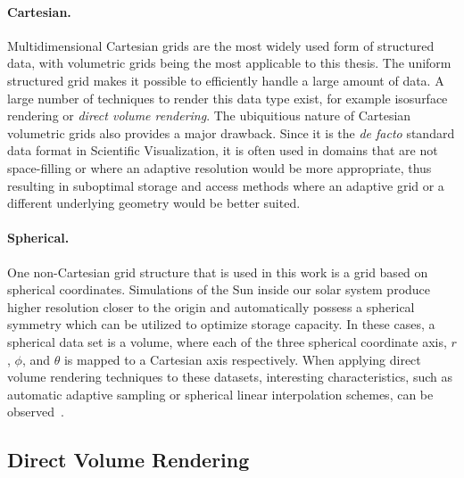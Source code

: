 \paragraph{Cartesian. }  Multidimensional Cartesian grids are the most widely used form of structured data, with  volumetric grids being the most applicable to this thesis.  The uniform structured grid makes it possible to efficiently handle a large amount of data.  A large number of techniques to render this data type exist, for example isosurface rendering or \emph{direct volume rendering}.  The ubiquitious nature of Cartesian volumetric grids also provides a major drawback.  Since it is the \emph{de facto} standard data format in Scientific Visualization, it is often used in domains that are not space-filling or where an adaptive resolution would be more appropriate, thus resulting in suboptimal storage and access methods where an adaptive grid or a different underlying geometry would be better suited.

\paragraph{Spherical. }  One non-Cartesian grid structure that is used in this work is a grid based on spherical coordinates.  Simulations of the Sun inside our solar system produce higher resolution closer to the origin and automatically possess a spherical symmetry which can be utilized to optimize storage capacity.  In these cases, a spherical data set is a  volume, where each of the three spherical coordinate axis, $r$, $\phi$, and $\theta$ is mapped to a Cartesian axis respectively.  When applying direct volume rendering techniques to these datasets, interesting characteristics, such as automatic adaptive sampling or spherical linear interpolation schemes, can be observed~\cite{balabanian2007sonar}.

\subsection{Direct Volume Rendering} \label{cha:intro:vp:dvr}
\begin{figure}
  \centering
  \label{fig:intro:dvr}
\end{figure}


